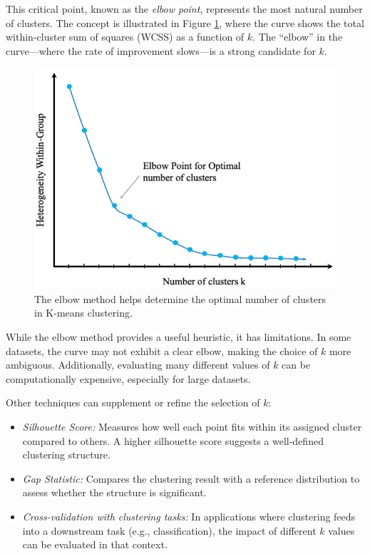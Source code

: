 \documentclass[
]{book}
\providecommand{\tightlist}{%
  \setlength{\itemsep}{0pt}\setlength{\parskip}{0pt}}
\theoremstyle{definition}
\theoremstyle{definition}
\theoremstyle{definition}
\theoremstyle{definition}
\theoremstyle{remark}
\begin{document}
This critical point, known as the \emph{elbow point}, represents the most natural number of clusters. The concept is illustrated in Figure \ref{fig:cluster-elbow}, where the curve shows the total within-cluster sum of squares (WCSS) as a function of \(k\). The ``elbow'' in the curve---where the rate of improvement slows---is a strong candidate for \(k\).

\begin{figure}

{\centering \includegraphics[width=0.6\linewidth]{images/cluster_elbow} 

}

\caption{The elbow method helps determine the optimal number of clusters in K-means clustering.}\label{fig:cluster-elbow}
\end{figure}

While the elbow method provides a useful heuristic, it has limitations. In some datasets, the curve may not exhibit a clear elbow, making the choice of \(k\) more ambiguous. Additionally, evaluating many different values of \(k\) can be computationally expensive, especially for large datasets.

Other techniques can supplement or refine the selection of \(k\):

\begin{itemize}
\tightlist
\item
  \emph{Silhouette Score:} Measures how well each point fits within its assigned cluster compared to others. A higher silhouette score suggests a well-defined clustering structure.\\
\item
  \emph{Gap Statistic:} Compares the clustering result with a reference distribution to assess whether the structure is significant.\\
\item
  \emph{Cross-validation with clustering tasks:} In applications where clustering feeds into a downstream task (e.g., classification), the impact of different \(k\) values can be evaluated in that context.
\end{itemize}
\end{document}
